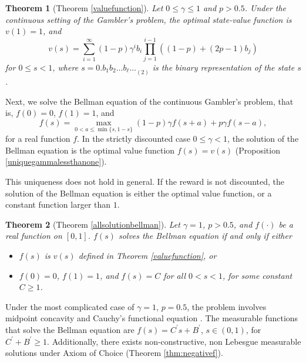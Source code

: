 \documentclass{article}
\theoremstyle{named}
\newtheorem*{namedtheorem}{Theorem}
\begin{document}
\begin{namedtheorem}[Theorem \ref{valuefunction}]
Let $0\leq\gamma\leq 1$ and $p>0.5$. Under the continuous setting of the Gambler's problem, the optimal state-value function is $v(1)=1$, and 
\begin{equation}
\label{eqn:vs}
v(s)=\sum_{i=1}^\infty (1-p)\gamma^i b_i\prod_{j=1}^{i-1}((1-p)+(2p-1)b_j)
\end{equation}
for $0\leq s<1$, where $s={0.b_1b_2\dots b_\ell\dots}_{(2)}$ is the binary representation of the state $s$.
\end{namedtheorem}
Next, we solve the Bellman equation of the continuous Gambler's problem, that is, $f(0)=0$, $f(1)=1$, and
\begin{equation}
f(s) = \max_{0< a \leq \min\{s,1-s\}}(1-p)\gamma f(s+a)+p\gamma f(s-a),
\end{equation}
for a real function $f$.
In the strictly discounted case $0\leq\gamma < 1$, the solution of the Bellman equation 
is the optimal value function $f(s)=v(s)$ (Proposition \ref{uniquegammalessthanone}). 

This uniqueness does not hold in general. If the reward is not discounted, the solution of the Bellman equation is either the optimal value function, or a constant function larger than $1$.
\begin{namedtheorem}[Theorem \ref{allsolutionbellman}]
Let $\gamma = 1$, $p>0.5$, and $f(\cdot)$ be a real function on $[0,1]$. $f(s)$ solves the Bellman equation if and only if either
\begin{itemize}
\vspace{-0.5mm}
\item $f(s)$ is $v(s)$ defined in Theorem \ref{valuefunction}, or
\vspace{-0.5mm}
\item $f(0)=0$, $f(1)=1$, and $f(s)=C$ for all $0<s<1$, for some constant $C\geq 1$.
\end{itemize}
\end{namedtheorem}
Under the most complicated case of $\gamma=1$, $p=0.5$, the problem involves midpoint concavity and Cauchy's functional equation \citep{sierpinski1920equation,sierpinski1920fonctions}. The measurable functions that solve the Bellman equation are $f(s)=C^\prime s+B^\prime$, $s\in (0,1)$, for $C^\prime+B^\prime \geq 1$. Additionally, there exists non-constructive, non Lebesgue measurable solutions under Axiom of Choice (Theorem \ref{thm:negativef}).
\end{document}
